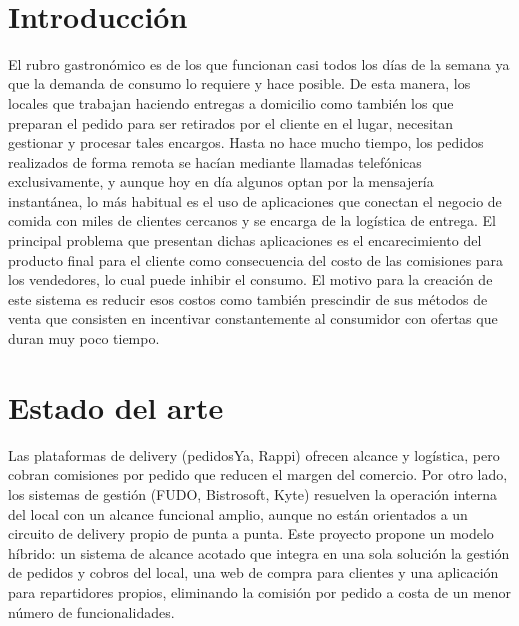 \documentclass[12pt,a4paper]{report}
\begin{document}
\tableofcontents
\newpage
\listoffigures
\newpage
\listofdiagrama %
\newpage


\newpage
~
\newpage
\texttt{}
\chapter{Introducción}
\begin{justify}
El rubro gastronómico es de los que funcionan casi todos los días de la semana ya que la demanda de consumo lo requiere y hace posible. De esta manera, los locales que trabajan haciendo entregas a domicilio como también los que preparan el pedido para ser retirados por el cliente en el lugar, necesitan gestionar y procesar tales encargos. Hasta no hace mucho tiempo, los pedidos realizados de forma remota se hacían mediante llamadas telefónicas exclusivamente, y aunque hoy en día algunos optan por la mensajería instantánea, lo más habitual es el uso de aplicaciones que conectan el negocio de comida con miles de clientes cercanos y se encarga de la logística de entrega.
El principal problema que presentan dichas aplicaciones es el encarecimiento del producto final para el cliente como consecuencia del costo de las comisiones para los vendedores, lo cual puede inhibir el consumo.
El motivo para la creación de este sistema es reducir esos costos como también prescindir de sus métodos de venta que consisten en incentivar constantemente al consumidor con ofertas que duran muy poco tiempo.
\end{justify}

	
\chapter{Estado del arte}
\begin{justify}
Las plataformas de delivery (pedidosYa, Rappi) ofrecen alcance y logística, pero cobran comisiones por pedido que reducen el margen del comercio. Por otro lado, los sistemas de gestión (FUDO, Bistrosoft, Kyte) resuelven la operación interna del local con un alcance funcional amplio, aunque no están orientados a un circuito de delivery propio de punta a punta. Este proyecto propone un modelo híbrido: un sistema de alcance acotado que integra en una sola solución la gestión de pedidos y cobros del local, una web de compra para clientes y una aplicación para repartidores propios, eliminando la comisión por pedido a costa de un menor número de funcionalidades.
\end{justify}
\end{document}
